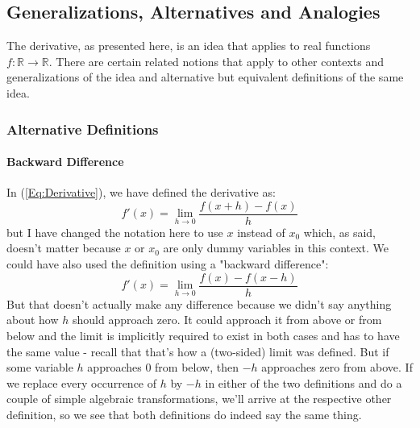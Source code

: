 



\subsection{Generalizations, Alternatives and Analogies}
The derivative, as presented here, is an idea that applies to real functions $f: \mathbb{R} \rightarrow \mathbb{R}$. There are certain related notions that apply to other contexts and generalizations of the idea and alternative but equivalent definitions of the same idea.

\subsubsection{Alternative Definitions}

\paragraph{Backward Difference}
In (\ref{Eq:Derivative}), we have defined the derivative as:
\begin{equation}
 f'(x) = \lim_{h \rightarrow 0} \frac{f(x + h) - f(x)}{h}
\end{equation}
but I have changed the notation here to use $x$ instead of $x_0$ which, as said, doesn't matter because $x$ or $x_0$ are only dummy variables in this context. We could have also used the definition using a "backward difference":
\begin{equation}
 f'(x) = \lim_{h \rightarrow 0} \frac{f(x) - f(x-h)}{h}
\end{equation}
But that doesn't actually make any difference because we didn't say anything about how $h$ should approach zero. It could approach it from above or from below and the limit is implicitly required to exist in both cases and has to have the same value - recall that that's how a (two-sided) limit was defined. But if some variable $h$ approaches $0$ from below, then $-h$ approaches zero from above. If we replace every occurrence of $h$ by $-h$ in either of the two definitions and do a couple of simple algebraic transformations, we'll arrive at the respective other definition, so we see that both definitions do indeed say the same thing.

